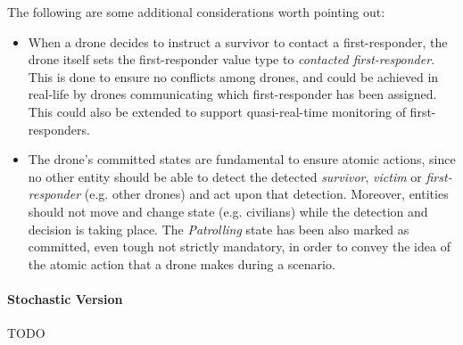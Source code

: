 \begin{enumerate}
	The following are some additional considerations worth pointing out:
	\begin{itemize}
		\item 	When a drone decides to instruct a survivor to contact a first-responder, the drone itself sets the first-responder value type to \textit{contacted first-responder}. This is done to ensure no conflicts among drones, and could be achieved in real-life by drones communicating which first-responder has been assigned. This could also be extended to support quasi-real-time monitoring of first-responders.\newline
		\item 	The drone's committed states are fundamental to ensure atomic actions, since no other entity should be able to detect the detected \textit{survivor}, \textit{victim} or \textit{first-responder} (e.g. other drones) and act upon that detection. Moreover, entities should not move and change state (e.g. civilians) while the detection and decision is taking place. The \textit{Patrolling} state has been also marked as committed, even tough not strictly mandatory, in order to convey the idea of the atomic action that a drone makes during a scenario.
	\end{itemize}
\end{enumerate}

\paragraph{Stochastic Version}
TODO

